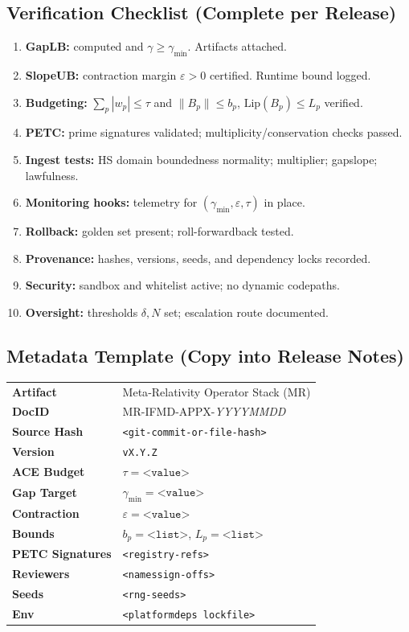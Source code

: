 \documentclass[10pt]{article}
\begin{document}
\subsection*{Verification Checklist (Complete per Release)}
\newcommand{\boxempty}{\(\square\)}
\begin{enumerate}[label=\boxempty\, C\arabic*., leftmargin=3.2em]
\item \textbf{GapLB:} computed and \(\gamma\ge\gamma_{\min}\). Artifacts attached.
\item \textbf{SlopeUB:} contraction margin \(\varepsilon>0\) certified. Runtime bound logged.
\item \textbf{Budgeting:} \(\sum_p |w_p|\le\tau\) and \(\|B_p\|\le b_p\), \(\mathrm{Lip}(B_p)\le L_p\) verified.
\item \textbf{PETC:} prime signatures validated; multiplicity/conservation checks passed.
\item \textbf{Ingest tests:} HS domain \/ boundedness \/ normality; multiplier; gap\/slope; lawfulness.
\item \textbf{Monitoring hooks:} telemetry for \((\gamma_{\min},\varepsilon,\tau)\) in place.
\item \textbf{Rollback:} golden set present; roll-forward\/back tested.
\item \textbf{Provenance:} hashes, versions, seeds, and dependency locks recorded.
\item \textbf{Security:} sandbox and whitelist active; no dynamic codepaths.
\item \textbf{Oversight:} thresholds \(\delta,N\) set; escalation route documented.
\end{enumerate}


\subsection*{Metadata Template (Copy into Release Notes)}
\begin{tabular}{@{}ll@{}}
\textbf{Artifact} & Meta‑Relativity Operator Stack (MR) \\
\textbf{DocID} & MR-IFMD-APPX-\textit{YYYYMMDD} \\
\textbf{Source Hash} & \texttt{<git-commit-or-file-hash>} \\
\textbf{Version} & \texttt{vX.Y.Z} \\
\textbf{ACE Budget} & \(\tau=\texttt{<value>}\) \\
\textbf{Gap Target} & \(\gamma_{\min}=\texttt{<value>}\) \\
\textbf{Contraction} & \(\varepsilon=\texttt{<value>}\) \\
\textbf{Bounds} & \(b_p=\texttt{<list>}\), \(L_p=\texttt{<list>}\) \\
\textbf{PETC Signatures} & \texttt{<registry-refs>} \\
\textbf{Reviewers} & \texttt{<names\/sign-offs>} \\
\textbf{Seeds} & \texttt{<rng-seeds>} \\
\textbf{Env} & \texttt{<platform\/deps lockfile>} \\
\end{tabular}
\end{document}
